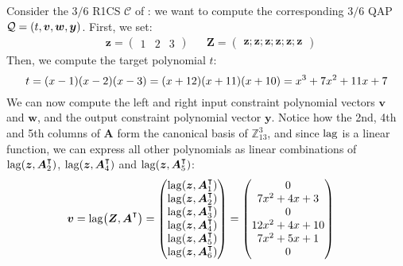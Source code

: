 \begin{example}
	Consider the \(3/6\) R1CS \(\mathcal{C}\) of : we want to compute the corresponding 
	\(3/6\) QAP \(\mathcal{Q} = \left(t, \bm{v}, \bm{w}, \bm{y}\right)\).
	First, we set:
	\begin{align*}
		 & \bm{z} = \begin{pmatrix}1 & 2 & 3\end{pmatrix} &  &
		\bm{Z} = \begin{pmatrix}\bm{z}; \bm{z}; \bm{z}; \bm{z}; \bm{z}; \bm{z}\end{pmatrix}
	\end{align*}
	Then, we compute the target polynomial \(t\):
	\[
		t = \Parens*{x - 1}\Parens*{x - 2}\Parens*{x - 3} =
	  \Parens*{x + 12}\Parens*{x + 11}\Parens*{x + 10} = x^3 + 7x^2 + 11x + 7
	\]
	We can now compute the left and right input constraint polynomial
	vectors \(\bm{v}\) and \(\bm{w}\), and the output constraint polynomial vector \(\bm{y}\).
	Notice how the 2nd, 4th and 5th columns of \(\bm{A}\) form the canonical basis of
	\(\mathbb{Z}_{13}^3\), and since \(\mathrm{lag} \) is a linear function, we can express all other 
	polynomials as linear combinations of \(\call{\lagrange}{\bm{z}, \bm{A}_2^{\transpose}}\), 
	\(\call{\lagrange}{\bm{z}, \bm{A}_4^{\transpose}}\) and 
	\(\call{\lagrange}{\bm{z}, \bm{A}_5^{\transpose}}\):
	\begin{align*}
		& \bm{v} = \call{\lagrange}{\bm{Z}, \bm{A}^{\transpose}} =
		\begin{pmatrix}
			\call{\lagrange}{\bm{z}, \bm{A}^{\transpose}_{1}} \\
			\call{\lagrange}{\bm{z}, \bm{A}^{\transpose}_{2}} \\
			\call{\lagrange}{\bm{z}, \bm{A}^{\transpose}_{3}} \\
			\call{\lagrange}{\bm{z}, \bm{A}^{\transpose}_{4}} \\
			\call{\lagrange}{\bm{z}, \bm{A}^{\transpose}_{5}} \\
			\call{\lagrange}{\bm{z}, \bm{A}^{\transpose}_{6}}
		\end{pmatrix}
		= {\begin{pmatrix}
			   0               \\
			   7x^2 + 4x + 3   \\
			   0               \\
			   12x^2 + 4x + 10 \\
			   7x^2 + 5x + 1   \\
			   0
		   \end{pmatrix}}
	\end{align*}

\end{example}
